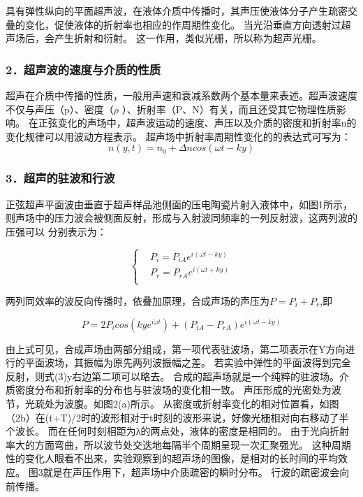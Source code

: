 \documentclass[12pt,a4paper,UTF8]{ctexart}
\begin{document}
具有弹性纵向的平面超声波，在液体介质中传播时，其声压使液体分子产生疏密交叠的变化，促使液体的折射率也相应的作周期性变化。
当光沿垂直方向透射过超声场后，会产生折射和衍射。
这一作用，类似光栅，所以称为超声光栅。

\subsubsection*{2．超声波的速度与介质的性质}
超声在介质中传播的性质，一般用声速和衰减系数两个基本量来表述。超声波速度不仅与声压（p）、密度（$\rho$ ）、折射率（P、N）有关，而且还受其它物理性质影响。
在正弦变化的声场中，超声波运动的速度、声压以及介质的密度和折射率n的变化规律可以用波动方程表示。
超声场中折射率周期性变化的的表达式可写为：
\begin{equation}
	n(y,t)=n_0+\varDelta n cos(\omega t-ky)
\end{equation}

\subsubsection*{3．超声的驻波和行波}
正弦超声平面波由垂直于超声样品池侧面的压电陶瓷片射入液体中，如图1所示，则声场中的压力波会被侧面反射，形成与入射波同频率的一列反射波，这两列波的压强可以
分别表示为：

\begin{equation}
	\begin{cases}
		&P_i=P_{iA}e^{i(\omega t-ky)} \\
		&P_r=P_{rA}e^{i(\omega t+ky)}\\
	\end{cases}
\end{equation}

两列同效率的波反向传播时，依叠加原理，合成声场的声压为$P=P_i+P_r$,即

\begin{equation}
	P=2P_icos(kye^{i\omega t})+(P_{iA}-P_{rA})e^{i(\omega t-ky)}
\end{equation}

由上式可见，合成声场由两部分组成，第一项代表驻波场，第二项表示在Y方向进行的平面波场，其振幅为原先两列波振幅之差。
若实验中弹性的平面波得到完全反射，则式(3)y右边第二项可以略去。
合成的超声场就是一个纯粹的驻波场。介质密度分布和折射率的分布也与驻波场的变化相一致。
声压形成的光密处为波节，光疏处为波腹。如图2(a)所示。
从密度或折射率变化的相对位置看，如图（2b）在(t+T)/2时的波形相对于t时刻的波形来说，好像光栅相对向右移动了半个波长。
而在任何时刻相距为λ的两点处，液体的密度是相同的。
由于光向折射率大的方面弯曲，所以波节处交迭地每隔半个周期呈现一次汇聚强光。
这种周期性的变化人眼看不出来，实验观察到的超声场的图像，是相对的长时间的平均效应。
图3就是在声压作用下，超声场中介质疏密的瞬时分布。
行波的疏密波会向前传播。
\end{document}
